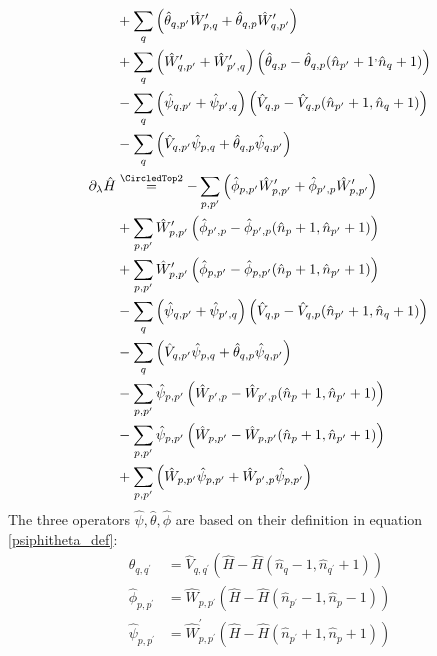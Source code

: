 \begin{appendix}
\begin{subequations}
\begin{align}
&+     \Sum_{q}\left(\hat\theta_{ q, p^\prime}\hat W_{p,q}^\prime+\hat\theta_{ q, p}\hat W_{q,p^\prime}^\prime\right)                      \nonumber\\
&+      \Sum_{q}\left(\hat W_{q,p^\prime}^\prime+\hat W_{p^\prime,q}^\prime\right) \left(\hat\theta_{ q,p}-\hat\theta_{ q,p}(\hat n_{p^\prime}+1^,\hat n_{q}+1)\right)                     \nonumber\\
&-      \Sum_{q}\left(\hat \psi_{q,p^\prime}+\hat \psi_{p^\prime,q}\right) \left(\hat V_{ q,p}-\hat V_{ q,p}(\hat n_{p^\prime}+1,\hat n_{q}+1)\right)                     \nonumber\\
&-      \Sum_{q}\left(\hat V_{ q, p^\prime}\hat \psi_{p,q}+\hat\theta_{ q, p}\hat \psi_{q,p^\prime}\right)                     \nonumber\\
\partial_\lambda\hat H&\eqsec -\Sum_{p, p^\prime}\left( \hat\phi_{ p, p^\prime}\hat W_{p,p^\prime}^\prime+ \hat\phi_{p^\prime,p}\hat W_{p,p^\prime}^\prime\right) \label{feq_ndep_IV}\\
&+\Sum_{p, p^\prime}\hat W_{p,p^\prime}^\prime \left(\hat\phi_{p^\prime,p}-\hat\phi_{p^\prime,p}(\hat n_p+1,\hat n_{p^\prime}+1)\right) \nonumber\\
&+\Sum_{p, p^\prime}\hat W_{p,p^\prime}^\prime \left(\hat\phi_{ p, p^\prime}-\hat\phi_{ p, p^\prime}(\hat n_p+1,\hat n_{p^\prime}+1)\right)\nonumber\\
&-\Sum_{q}\left(\hat \psi_{q,p^\prime}+\hat \psi_{p^\prime,q}\right) \left(\hat V_{ q,p}-\hat V_{ q,p}(\hat n_{p^\prime}+1,\hat n_{q}+1)\right)                           \nonumber\\
&-\Sum_{q}\left(\hat V_{ q, p^\prime}\hat \psi_{p,q}+\hat\theta_{ q, p}\hat \psi_{q,p^\prime}\right)                           \nonumber\\
&-\Sum_{p, p^\prime}\hat \psi_{p,p^\prime} \left(\hat W_{p^\prime,p}-\hat W_{p^\prime,p}(\hat n_p+1,\hat n_{p^\prime}+1)\right) \nonumber\\
&-\Sum_{p, p^\prime}\hat \psi_{p,p^\prime} \left(\hat W_{ p, p^\prime}-\hat W_{ p, p^\prime}(\hat n_p+1,\hat n_{p^\prime}+1)\right)\nonumber\\
&+\Sum_{p, p^\prime}\left( \hat W_{ p, p^\prime}\hat \psi_{p,p^\prime}+ \hat W_{p^\prime,p}\hat \psi_{p,p^\prime}\right)\nonumber
\end{align}
\end{subequations}
The three operators $\hat\psi,\hat\theta,\hat\phi$ are based on their definition in equation \ref{psiphitheta_def}:
\begin{align}
\hat\theta_{q,q^\prime}&=\hat V_{q,q^\prime} \left(\hat H - \hat H(\hat n_q-1,\hat n_{q^\prime}+1)\right)\\
\hat\phi_{p,p^\prime}&=\hat W_{p,p^\prime}\left(\hat H-\hat H(\hat n_{p^\prime}-1,\hat n_p -1)\right)\\
\hat\psi_{p,p^\prime}&=\hat W_{p,p^\prime}^\prime\left(\hat H-\hat H(\hat n_{p^\prime}+1,\hat n_p +1)\right)
\end{align}

\end{appendix}
